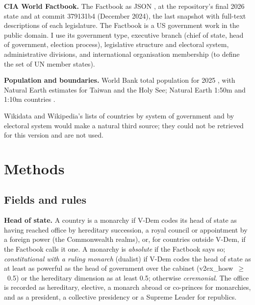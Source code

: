 \documentclass[11pt,a4paper]{article}
\begin{document}
\textbf{CIA World Factbook.} The Factbook as JSON \citep{factbook}, at the repository's final 2026 state and at commit 379131b4 (December 2024), the last snapshot with full-text descriptions of each legislature. The Factbook is a US government work in the public domain. I use its government type, executive branch (chief of state, head of government, election process), legislative structure and electoral system, administrative divisions, and international organisation membership (to define the set of UN member states).

\textbf{Population and boundaries.} World Bank total population for 2025 \citep{wb}, with Natural Earth estimates for Taiwan and the Holy See; Natural Earth 1:50m and 1:10m countries \citep{naturalearth}.

Wikidata and Wikipedia's lists of countries by system of government and by electoral system would make a natural third source; they could not be retrieved for this version and are not used.

\section{Methods}
\subsection{Fields and rules}
\textbf{Head of state.} A country is a monarchy if V-Dem codes its head of state as having reached office by hereditary succession, a royal council or appointment by a foreign power (the Commonwealth realms), or, for countries outside V-Dem, if the Factbook calls it one. A monarchy is \emph{absolute} if the Factbook says so; \emph{constitutional with a ruling monarch} (dualist) if V-Dem codes the head of state as at least as powerful as the head of government over the cabinet (v2ex\_hosw~$\geq$~0.5) or the hereditary dimension as at least 0.5; otherwise \emph{ceremonial}. The office is recorded as hereditary, elective, a monarch abroad or co-princes for monarchies, and as a president, a collective presidency or a Supreme Leader for republics.
\end{document}
